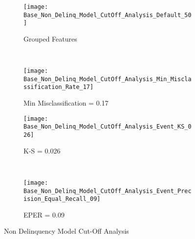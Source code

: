 \begin{figure}[H]
	\centering
	\begin{subfigure}[b]{ 0.45\textwidth}
		\captionsetup{font=scriptsize}
		\texttt{[image: Base\_Non\_Delinq\_Model\_CutOff\_Analysis\_Default\_50]}\caption{Grouped Features}\label{fig:Base_Non_Delinq_Model_CutOff_Analysis_Default_50}
	\end{subfigure}  ~\quad
	\begin{subfigure}[b]{0.45\textwidth}
		\captionsetup{font=scriptsize}
		\texttt{[image: Base\_Non\_Delinq\_Model\_CutOff\_Analysis\_Min\_Misclassification\_Rate\_17]}
		\caption{Min Misclassification = 0.17}\label{fig:Base_Non_Delinq_Model_CutOff_Analysis_Min_Misclassification_Rate_17}
	\end{subfigure} 
	\medskip \newline
	\begin{subfigure}[b]{0.45\textwidth}
		\captionsetup{font=scriptsize}
		\texttt{[image: Base\_Non\_Delinq\_Model\_CutOff\_Analysis\_Event\_KS\_026]}
		\caption{K-S = 0.026}\label{fig:Base_Non_Delinq_Model_CutOff_Analysis_Event_KS_026}
	\end{subfigure} ~\quad
	\begin{subfigure}[b]{0.45\textwidth}
		\captionsetup{font=scriptsize}
		\texttt{[image: Base\_Non\_Delinq\_Model\_CutOff\_Analysis\_Event\_Precision\_Equal\_Recall\_09]}
		\caption{EPER = 0.09}\label{fig:Base_Non_Delinq_Model_CutOff_Analysis_Event_Precision_Equal_Recall_09}
	\end{subfigure}
	\caption{Non Delinquency Model Cut-Off Analysis}
	\label{fig:balanced_corr_analysis}
\end{figure}

